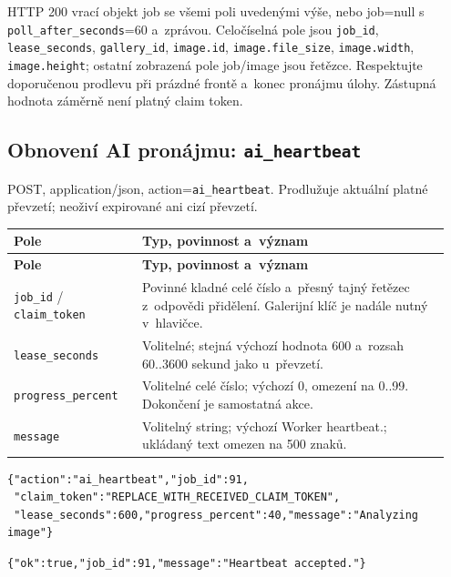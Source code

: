 \documentclass[11pt,a4paper]{article}
\newcommand{\codeword}[1]{\nolinkurl{#1}}
\begin{document}
HTTP 200 vrací objekt job se všemi poli uvedenými výše, nebo job=null s
\codeword{poll_after_seconds}=60 a~zprávou. Celočíselná pole jsou \codeword{job_id},
\codeword{lease_seconds}, \codeword{gallery_id}, \codeword{image.id},
\codeword{image.file_size}, \codeword{image.width}, \codeword{image.height}; ostatní
zobrazená pole job/image jsou řetězce. Respektujte doporučenou prodlevu při prázdné frontě
a~konec pronájmu úlohy. Zástupná hodnota záměrně není platný claim token.

\subsection{\texorpdfstring{Obnovení AI pronájmu: \codeword{ai_heartbeat}}{Obnovení AI pronájmu: ai\_heartbeat}}

\label{api352:ai-heartbeat}

POST, application/json, action=\codeword{ai_heartbeat}. Prodlužuje aktuální platné převzetí;
neoživí expirované ani cizí převzetí.

\begin{longtable}{@{}>{\RaggedRight\arraybackslash}p{0.28\linewidth}>{\RaggedRight\arraybackslash}p{0.67\linewidth}@{}}
\toprule
\textbf{Pole} & \textbf{Typ, povinnost a~význam} \\
\midrule
\endfirsthead
\toprule
\textbf{Pole} & \textbf{Typ, povinnost a~význam} \\
\midrule
\endhead
\bottomrule
\endfoot
\codeword{job_id} / \codeword{claim_token} & Povinné kladné celé číslo a~přesný tajný
řetězec z~odpovědi přidělení. Galerijní klíč je nadále nutný v~hlavičce. \\
\codeword{lease_seconds} & Volitelné; stejná výchozí hodnota 600 a~rozsah 60..3600 sekund
jako u~převzetí. \\
\codeword{progress_percent} & Volitelné celé číslo; výchozí 0, omezení na 0..99. Dokončení
je samostatná akce. \\
\codeword{message} & Volitelný string; výchozí Worker heartbeat.; ukládaný text omezen na
500 znaků. \\
\end{longtable}

\begin{lstlisting}[language={}]
{"action":"ai_heartbeat","job_id":91,
 "claim_token":"REPLACE_WITH_RECEIVED_CLAIM_TOKEN",
 "lease_seconds":600,"progress_percent":40,"message":"Analyzing image"}
\end{lstlisting}

\begin{lstlisting}[language={}]
{"ok":true,"job_id":91,"message":"Heartbeat accepted."}
\end{lstlisting}
\end{document}
